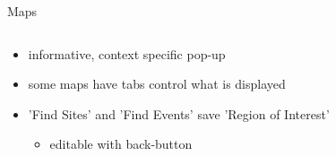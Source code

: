 \documentclass[presentation, smaller]{beamer}
\begin{document}
\begin{frame}[label=sec-3]{Maps}
\begin{columns}
\begin{column}{0.4\textwidth}
\begin{itemize}
\item informative, context specific pop-up
\item some maps have tabs control what is displayed
\item 'Find Sites' and 'Find Events' save 'Region of Interest'
\begin{itemize}
\item editable with back-button
\end{itemize}
\end{itemize}
\end{column}
\begin{column}{0.6\textwidth}
\end{column}
\end{columns}
\end{frame}
\end{document}
